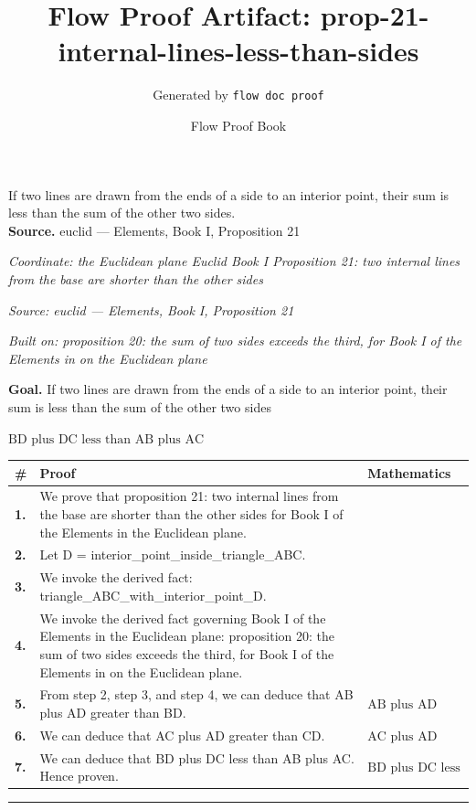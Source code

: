 \documentclass[11pt]{article}
\title{Flow Proof Artifact: prop-21-internal-lines-less-than-sides}
\author{Generated by \texttt{flow doc proof}}
\date{Flow Proof Book}
\theoremstyle{definition}
\begin{document}
\maketitle
If two lines are drawn from the ends of a side to an interior point, their sum is less than the sum of the other two sides.\\[0.5em]
\textbf{Source.} euclid — Elements, Book I, Proposition 21\\[0.5em]
\bigskip
{}\par
\smallskip\noindent\textit{Coordinate: the Euclidean plane \cdot Euclid Book I \cdot Proposition 21: two internal lines from the base are shorter than the other sides}\par
\smallskip\noindent\textit{Source: euclid — Elements, Book I, Proposition 21}\par
\smallskip\noindent\textit{Built on: proposition 20: the sum of two sides exceeds the third, for Book I of the Elements in on the Euclidean plane}\par
\medskip
\noindent\textbf{Goal.} If two lines are drawn from the ends of a side to an interior point, their sum is less than the sum of the other two sides\par
\noindent$\displaystyle \text{BD plus DC less than AB plus AC}$\par
\medskip
\noindent
\begin{tabular}{@{} >{\raggedright\arraybackslash}p{} >{\raggedright\arraybackslash}p{} >{\raggedleft\arraybackslash}p{} @{}}
\textbf{\#} & \textbf{Proof} & \textbf{Mathematics} \\
\midrule
\textbf{1.} & We prove that proposition 21: two internal lines from the base are shorter than the other sides for Book I of the Elements in the Euclidean plane. & \\[0.45em]
\textbf{2.} & Let D = interior\_point\_inside\_triangle\_ABC. & \\[0.45em]
\textbf{3.} & We invoke the derived fact: triangle\_ABC\_with\_interior\_point\_D. & \\[0.45em]
\textbf{4.} & We invoke the derived fact governing Book I of the Elements in the Euclidean plane: proposition 20: the sum of two sides exceeds the third, for Book I of the Elements in on the Euclidean plane. & \\[0.45em]
\textbf{5.} & From step 2, step 3, and step 4, we can deduce that AB plus AD greater than BD. & $\displaystyle \text{AB plus AD greater than BD}$ \\[0.45em]
\textbf{6.} & We can deduce that AC plus AD greater than CD. & $\displaystyle \text{AC plus AD greater than CD}$ \\[0.45em]
\textbf{7.} & We can deduce that BD plus DC less than AB plus AC. Hence proven. & $\displaystyle \text{BD plus DC less than AB plus AC}$ \\[0.45em]
\bottomrule
\end{tabular}
\label{thm:Geometry-Euclid Book I-proposition_21_two_internal_lines_from_the_base_are_shorter_than_the_other_sides}
\par\medskip\hrule
\end{document}
